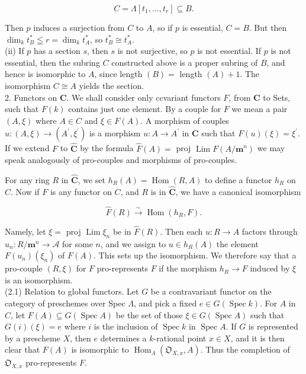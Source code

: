 \documentclass[10pt]{article}
\begin{document}
$$
C=\Lambda\left[t_{1}, \ldots, t_{r}\right] \subseteq B .
$$

Then $p$ induces a surjection from $C$ to $A$, so if $p$ is essential, $C=B$. But then $\operatorname{dim}_{k} t_{B}^{*} \leqq r=\operatorname{dim}_{k} t_{A}^{*}$, so $t_{B}^{*} \cong t_{A}^{*}$.\\
(ii) If $p$ has a section $s$, then $s$ is not surjective, so $p$ is not essential. If $p$ is not essential, then the subring $C$ constructed above is a proper subring of $B$, and hence is isomorphic to $A$, since length $(B)=$ length $(A)+1$. The isomorphism $C \cong A$ yields the section.\\
2. Functors on $\boldsymbol{C}$. We shall consider only ccvariant functors $F$, from $\boldsymbol{C}$ to Sets, such that $F(k)$ contains just one element. By a couple for $F$ we mean a pair $(A, \xi)$ where $A \in C$ and $\xi \in F(A)$. A morphism of couples $u:(A, \xi) \rightarrow\left(A^{\prime}, \xi^{\prime}\right)$ is a morphism $u: A \rightarrow A^{\prime}$ in $\boldsymbol{C}$ such that $F(u)(\xi)=\xi^{\prime}$. If we extend $F$ to $\hat{\boldsymbol{C}}$ by the formula $\hat{F}(A)=$ proj $\operatorname{Lim} F\left(A / \boldsymbol{m}^{n}\right)$ we may speak analogously of pro-couples and morphisms of pro-couples.

For any ring $R$ in $\hat{\boldsymbol{C}}$, we set $h_{R}(A)=\operatorname{Hom}(R, A)$ to define a functor $h_{R}$ on $C$. Now if $F$ is any functor on $C$, and $R$ is in $\hat{\boldsymbol{C}}$, we have a canonical isomorphism

$$
\hat{F}(R) \xrightarrow{\sim} \operatorname{Hom}\left(h_{R}, F\right) .
$$

Namely, let $\xi=$ proj $\operatorname{Lim} \xi_{n}$ be in $\hat{F}(R)$. Then each $u: R \rightarrow A$ factors through $u_{n}: R / \boldsymbol{m}^{n} \rightarrow \mathcal{A}$ for some $n$, and we assign to $u \in h_{R}(A)$ the element $F\left(u_{n}\right)\left(\xi_{n}\right)$ of $F(A)$. This sets up the isomorphism. We therefore say that a pro-couple $(R, \xi)$ for $F$ pro-represents $F$ if the morphism $h_{R} \rightarrow F$ induced by $\xi$ is an isomorphism.\\
(2.1) Relation to global functors. Let $G$ be a contravariant functor on the category of preschemes over Spec $\Lambda$, and pick a fixed $e \in G(\operatorname{Spec} k)$. For $A$ in $C$, let $F(A) \subseteq G(\operatorname{Spec} A)$ be the set of those $\xi \in G(\operatorname{Spec} A)$ such that $G(i)(\xi)=e$ where $i$ is the inclusion of $\operatorname{Spec} k$ in $\operatorname{Spec} A$. If $G$ is represented by a prescheme $X$, then $e$ determines a $k$-rational point $x \in X$, and it is then clear that $F(A)$ is isomorphic to $\operatorname{Hom}_{\Lambda}\left(\mathfrak{O}_{X, x}, A\right)$. Thus the completion of $\mathfrak{O}_{X, x}$ pro-represents $F$.
\end{document}
